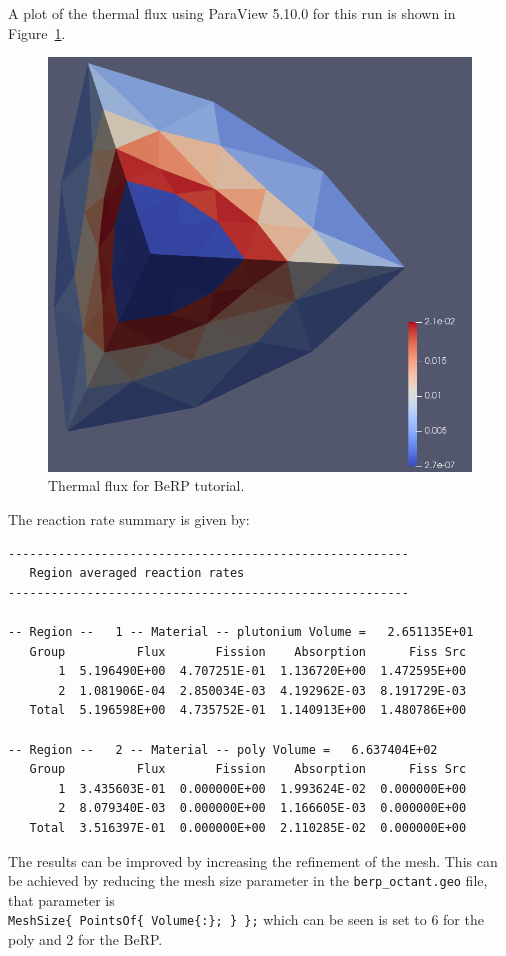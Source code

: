 A plot of the thermal flux using ParaView 5.10.0 for this run is shown in Figure~\ref{fig:berp_thermal}.
\begin{figure}[th]
  \center
  \includegraphics[height=0.5\textwidth]{chapters/tutorials/figures/berp_thermal.png}
  \caption{Thermal flux for BeRP tutorial.}
  \label{fig:berp_thermal}
\end{figure}

The reaction rate summary is given by:
\begin{verbatim}
--------------------------------------------------------
   Region averaged reaction rates
--------------------------------------------------------

-- Region --   1 -- Material -- plutonium Volume =   2.651135E+01
   Group          Flux       Fission    Absorption      Fiss Src
       1  5.196490E+00  4.707251E-01  1.136720E+00  1.472595E+00
       2  1.081906E-04  2.850034E-03  4.192962E-03  8.191729E-03
   Total  5.196598E+00  4.735752E-01  1.140913E+00  1.480786E+00

-- Region --   2 -- Material -- poly Volume =   6.637404E+02
   Group          Flux       Fission    Absorption      Fiss Src
       1  3.435603E-01  0.000000E+00  1.993624E-02  0.000000E+00
       2  8.079340E-03  0.000000E+00  1.166605E-03  0.000000E+00
   Total  3.516397E-01  0.000000E+00  2.110285E-02  0.000000E+00
\end{verbatim}

The results can be improved by increasing the refinement of the mesh.
This can be achieved by reducing the mesh size parameter in the \verb"berp_octant.geo" file, that parameter is \\
\verb"MeshSize{ PointsOf{ Volume{:}; } };" which can be seen is set to 6 for the poly and 2 for the BeRP.